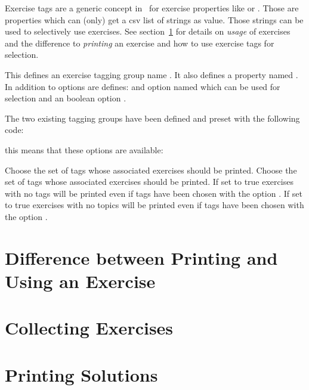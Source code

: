 \documentclass[load-preamble+]{cnltx-doc}
\begin{document}
Exercise tags are a generic concept in \xsim\ for exercise properties like
 or .  Those are properties which can (only)
get a csv list of strings as value.  Those strings can be used to selectively
use exercises.  See section~\ref{sec:diff-betw-print} for details on
\emph{usage} of exercises and the difference to \emph{printing} an exercise
and how to use exercise tags for selection.
\begin{commands}
    This defines an exercise tagging group name .  It also defines a
    property named .  In addition to options are defines: and option
    named  which can be used for selection and an boolean
    option .
\end{commands}
The two existing tagging groups have been defined and preset with the
following code:
\begin{sourcecode}
\end{sourcecode}
this means that these options are available:
\begin{options}
    Choose the set of tags whose associated exercises should be printed.
    Choose the set of tags whose associated exercises should be printed.
    If set to true exercises with no tags will be printed even if tags have
    been chosen with the option .
    If set to true exercises with no topics will be printed even if tags have
    been chosen with the option .
\end{options}


\section{Difference between Printing and Using an Exercise}\label{sec:diff-betw-print}

\section{Collecting Exercises}

\section{Printing Solutions}\label{sec:printing-solutions}
\end{document}
